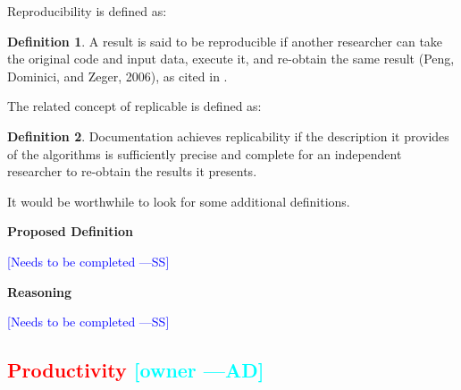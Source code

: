 \documentclass[letterpaper,cleveref]{lipics-v2019}
\newcommand{\authornote}[3]{\textcolor{#1}{[#3 ---#2]}}
\newcommand{\authornote}[3]{}
\newcommand{\wss}[1]{\authornote{blue}{SS}{#1}} %
\newcommand{\ad}[1]{\authornote{cyan}{AD}{#1}} %
\newcommand{\notdone}[1]{\textcolor{red}{#1}}
\theoremstyle{definition}
\newtheorem{defn}{Definition}
\begin{document}
Reproducibility is defined as:

\begin{defn}
A result is said to be reproducible if another researcher can take the original
code and input data, execute it, and re-obtain the same result (Peng, Dominici,
and Zeger, 2006), as cited in \citet{BenureauAndRougier2017}.
\end{defn}

The related concept of replicable is defined as:

\begin{defn}
Documentation achieves replicability if the description it provides of the
algorithms is sufficiently precise and complete for an independent researcher to
re-obtain the results it presents.  \citep{BenureauAndRougier2017}
\end{defn}

It would be worthwhile to look for some additional definitions.

\noindent \textbf{Proposed Definition} 

\wss{Needs to be completed}

\noindent \textbf{Reasoning}

\wss{Needs to be completed}

\subsection{\notdone{Productivity} \ad{owner}}
\end{document}
